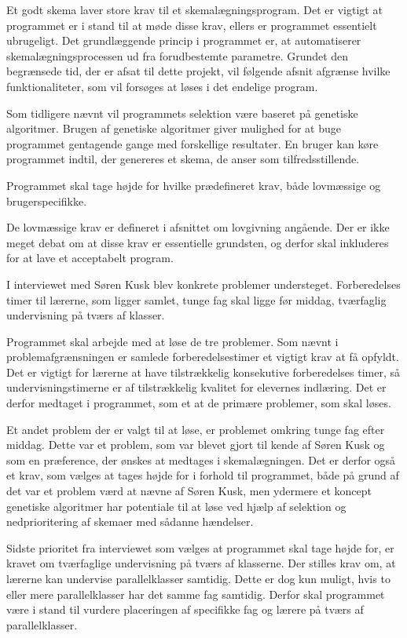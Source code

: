 Et godt skema laver store krav til et skemalægningsprogram. Det er vigtigt at programmet er i stand til at møde disse krav, ellers er programmet essentielt ubrugeligt. Det grundlæggende princip i programmet er, at automatiserer skemalægningsprocessen ud fra forudbestemte parametre. Grundet den begrænsede tid, der er afsat til dette projekt, vil følgende afsnit afgrænse hvilke funktionaliteter, som vil forsøges at løses i det endelige program.

Som tidligere nævnt vil programmets selektion være baseret på genetiske algoritmer. Brugen af genetiske algoritmer giver mulighed for at buge programmet gentagende gange med forskellige resultater. En bruger kan køre programmet indtil, der genereres et skema, de anser som tilfredsstillende.

Programmet skal tage højde for hvilke prædefineret krav, både lovmæssige og brugerspecifikke.

De lovmæssige krav er defineret i afsnittet om lovgivning angående. Der er ikke meget debat om at disse krav er essentielle grundsten, og derfor skal inkluderes for at lave et acceptabelt program. 

I interviewet med Søren Kusk blev konkrete problemer understeget. Forberedelses timer til lærerne, som ligger samlet, tunge fag skal ligge før middag, tværfaglig undervisning på tværs af klasser.\cite{interview}

Programmet skal arbejde med at løse de tre problemer. Som nævnt i problemafgrænsningen er samlede forberedelsestimer et vigtigt krav at få opfyldt. Det er vigtigt for lærerne at have tilstrækkelig konsekutive forberedelses timer, så undervisningstimerne er af tilstrækkelig kvalitet for elevernes indlæring. Det er derfor medtaget i programmet, som et at de primære problemer, som skal løses. 

Et andet problem der er valgt til at løse, er problemet omkring tunge fag efter middag. Dette var et problem, som var blevet gjort til kende af Søren Kusk og som en præference, der ønskes at medtages i skemalægningen.\cite{interview} Det er derfor også et krav, som vælges at tages højde for i forhold til programmet, både på grund af det var et problem værd at nævne af Søren Kusk, men ydermere et koncept genetiske algoritmer har potentiale til at løse ved hjælp af selektion og nedprioritering af skemaer med sådanne hændelser.

Sidste prioritet fra interviewet som vælges at programmet skal tage højde for, er kravet om tværfaglige undervisning på tværs af klasserne. Der stilles krav om, at lærerne kan undervise parallelklasser samtidig. Dette er dog kun muligt, hvis to eller mere parallelklasser har det samme fag samtidig. Derfor skal programmet være i stand til vurdere placeringen af specifikke fag og lærere på tværs af parallelklasser. 

